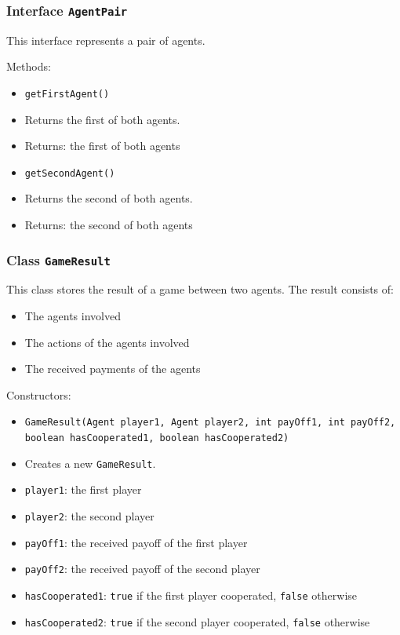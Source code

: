 \documentclass[parskip=full,11pt]{scrartcl}
\begin{document}
\subsubsection{Interface \texttt{AgentPair}}
This interface represents a pair of agents.

Methods:
\begin{itemize}\itemsep -10pt
\item \texttt{getFirstAgent()}
\item[] Returns the first of both agents.
\item[] Returns: the first of both agents

\item \texttt{getSecondAgent()}
\item[] Returns the second of both agents.
\item[] Returns: the second of both agents
\end{itemize}

\subsubsection{Class \texttt{GameResult}}

This class stores the result of a game between two agents. The result consists of:
\begin{itemize}\itemsep -10pt
	\item The agents involved
	\item The actions of the agents involved
	\item The received payments of the agents
\end{itemize}
	
Constructors:
\begin{itemize}\itemsep -10pt
\item \texttt{GameResult(Agent player1, Agent player2, int payOff1, int payOff2, boolean hasCooperated1, boolean hasCooperated2)}
\item[] Creates a new \texttt{GameResult}.
\item[] \texttt{player1}: the first player
\item[] \texttt{player2}: the second player
\item[] \texttt{payOff1}: the received payoff of the first player
\item[] \texttt{payOff2}: the received payoff of the second player
\item[] \texttt{hasCooperated1}: \texttt{true} if the first player cooperated, \texttt{false} otherwise
\item[] \texttt{hasCooperated2}: \texttt{true} if the second player cooperated, \texttt{false} otherwise
\end{itemize}
\end{document}
